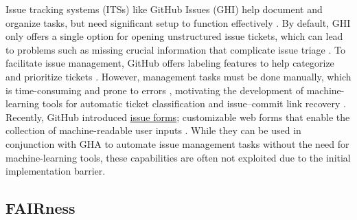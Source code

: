 \documentclass{article}
\begin{document}
Issue tracking systems (ITSs) like GitHub Issues (GHI) help document and organize tasks, but need significant setup to function effectively \cite{SurveySEPracticesInScience, DLRSoftEngGuidelines, ELIXIRSoftwareManagementPlan, EmpAnalysisOfIssueTemplatesOnGitHub}. By default, GHI only offers a single option for opening unstructured issue tickets, which can lead to problems such as missing crucial information that complicate issue triage \cite{EmpAnalysisOfIssueTemplatesOnGitHub}. To facilitate issue management, GitHub offers labeling features to help categorize and prioritize tickets \cite{GiLaGitHubLabelAnalyzer, ExploringCharacIssueRelatedGitHub}. However, management tasks must be done manually, which is time-consuming and prone to errors \cite{WhereIsTheRoadForIssueReports, GotIssues, ExploringTheUseOfLabels, FillingTheGapsOfDevLogs, MissingLinksBugsAndBugFix}, motivating the development of machine-learning tools for automatic ticket classification \cite{PredictingIssueTypesOnGitHub, ImpactOfDataQualityForAutomaticIssueClassification} and issue–commit link recovery \cite{IssueCommitLink-DeepLink, FRLink}. Recently, GitHub introduced \href{https://github.blog/changelog/2021-06-23-issues-forms-beta-for-public-repositories/}{issue forms}; customizable web forms that enable the collection of machine-readable user inputs \cite{EmpAnalysisOfIssueTemplatesOnGitHub, FirstLookAtBugReportTempOnGitHub, UnderstandingIssueTemplateOnGitHub}. While they can be used in conjunction with GHA to automate issue management tasks without the need for machine-learning tools, these capabilities are often not exploited due to the initial implementation barrier.

\subsection{FAIRness}
\end{document}
